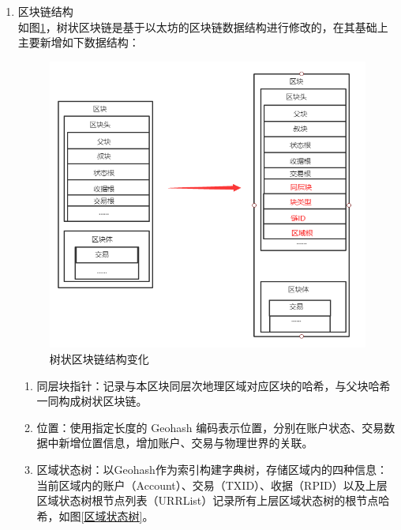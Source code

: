 \begin{enumerate}
 \item 区块链结构 \\
 如图\ref{树状区块链结构变化}，树状区块链是基于以太坊的区块链数据结构进行修改的，在其基础上主要新增如下数据结构：\\
 \begin{figure}[!htb]
  \centering
  \includegraphics[width=5in]{images/1.png}
  \caption{树状区块链结构变化}\label{树状区块链结构变化} %
\end{figure}

 \begin{enumerate}
  \item 同层块指针：记录与本区块同层次地理区域对应区块的哈希，与父块哈希一同构成树状区块链。
  \item 位置：使用指定长度的 Geohash 编码表示位置，分别在账户状态、交易数据中新增位置信息，增加账户、交易与物理世界的关联。
  \item 区域状态树：以Geohash作为索引构建字典树，存储区域内的四种信息：当前区域内的账户（Account）、交易（TXID）、收据（RPID）以及上层区域状态树根节点列表（URRList）记录所有上层区域状态树的根节点哈希，如图\ref{区域状态树}。
  

\end{enumerate}
\end{enumerate}

